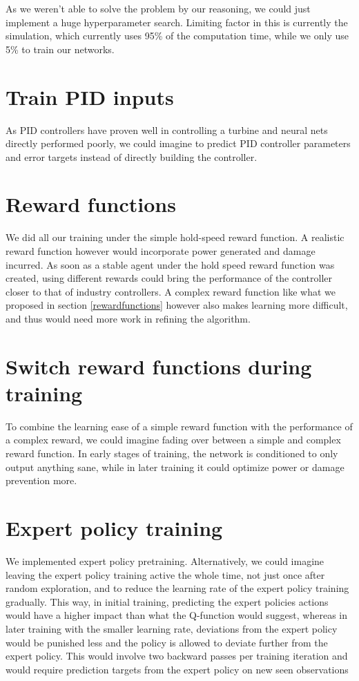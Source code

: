 \documentclass[hyperref,german,beleg]{cgvpub}
\begin{document}
As we weren't able to solve the problem by our reasoning, we could just implement a huge hyperparameter search. Limiting factor in this is currently the simulation, which currently uses 95\% of the computation time, while we only use 5\% to train our networks.

\section{Train PID inputs}

As PID controllers have proven well in controlling a turbine and neural nets directly performed poorly, we could imagine to predict PID controller parameters and error targets instead of directly building the controller. 

\section{Reward functions}

We did all our training under the simple hold-speed reward function. A realistic reward function however would incorporate power generated and damage incurred. As soon as a stable agent under the hold speed reward function was created, using different rewards could bring the performance of the controller closer to that of industry controllers. A complex reward function like what we proposed in section \ref{rewardfunctions} however also makes learning more difficult, and thus would need more work in refining the algorithm.

\section{Switch reward functions during training}
To combine the learning ease of a simple reward function with the performance of a complex reward, we could imagine fading over between a simple and complex reward function. In early stages of training, the network is conditioned to only output anything sane, while in later training it could optimize power or damage prevention more.


\section{Expert policy training}

We implemented expert policy pretraining. Alternatively, we could imagine leaving the expert policy training active the whole time, not just once after random exploration, and to reduce the learning rate of the expert policy training gradually. This way, in initial training, predicting the expert policies actions would have a higher impact than what the Q-function would suggest, whereas in later training with the smaller learning rate, deviations from the expert policy would be punished less and the policy is allowed to deviate further from the expert policy. This would involve two backward passes per training iteration and would require prediction targets from the expert policy on new seen observations
\end{document}
